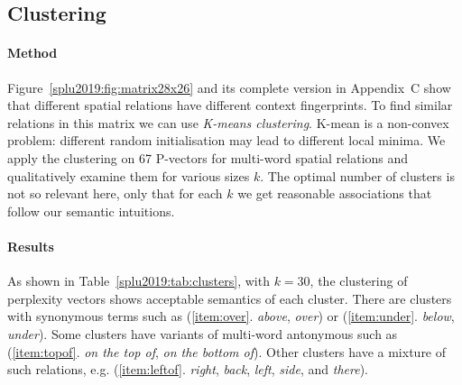 \subsection{Clustering}
\paragraph{Method} Figure~\ref{splu2019:fig:matrix28x26} and its complete version in %
Appendix~C
show that different spatial relations have
different context fingerprints. To find similar relations in this matrix we can use
\emph{K-means clustering}. %
K-mean is a non-convex problem: different random initialisation may lead to
different local minima.
We apply the clustering on 67 P-vectors for multi-word spatial relations
and qualitatively examine them for various sizes $k$. The optimal number of
clusters is not so relevant here, only that for each $k$ we get reasonable
associations that follow our semantic intuitions.

\paragraph{Results} As shown in Table~\ref{splu2019:tab:clusters}, with $k=30$, the
clustering of perplexity vectors shows acceptable semantics of each cluster.
There are clusters with synonymous terms such as (\ref{item:over}.
\emph{above}, \emph{over}) or (\ref{item:under}. \emph{below}, \emph{under}).
Some clusters have variants of multi-word antonymous such as (\ref{item:topof}.
\emph{on the top of}, \emph{on the bottom of}). Other clusters have a mixture
of such relations, e.g. (\ref{item:leftof}. \emph{right}, \emph{back},
\emph{left}, \emph{side}, and \emph{there}).

